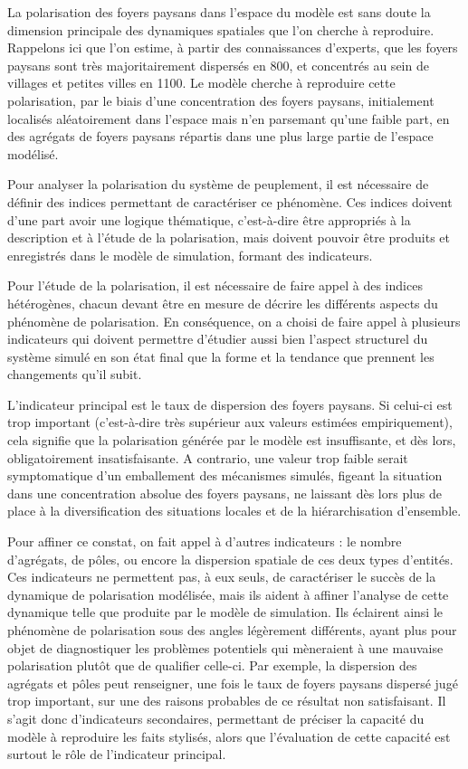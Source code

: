 La polarisation des foyers paysans dans l'espace du modèle est sans doute la dimension principale des dynamiques spatiales que l'on cherche à reproduire.
Rappelons ici que l'on estime, à partir des connaissances d'experts, que les foyers paysans sont très majoritairement dispersés en 800, et concentrés au sein de villages et petites villes en 1100.
Le modèle cherche à reproduire cette polarisation, par le biais d'une concentration des foyers paysans, initialement localisés aléatoirement dans l'espace mais n'en parsemant qu'une faible part, en des agrégats de foyers paysans répartis dans une plus large partie de l'espace modélisé.

Pour analyser la polarisation du système de peuplement, il est nécessaire de définir des indices permettant de caractériser ce phénomène.
Ces indices doivent d'une part avoir une logique thématique, c'est-à-dire être appropriés à la description et à l'étude de la polarisation, mais doivent pouvoir être produits et enregistrés dans le modèle de simulation, formant des indicateurs.

Pour l'étude de la polarisation, il est nécessaire de faire appel à des indices hétérogènes, chacun devant être en mesure de décrire les différents aspects du phénomène de polarisation.
En conséquence, on a choisi de faire appel à plusieurs indicateurs qui doivent permettre d'étudier aussi bien l'aspect structurel du système simulé en son état final que la forme et la tendance que prennent les changements qu'il subit.

L'indicateur principal est le taux de dispersion des foyers paysans.
Si celui-ci est trop important (c'est-à-dire très supérieur aux valeurs estimées empiriquement), cela signifie que la polarisation générée par le modèle est insuffisante, et dès lors, obligatoirement insatisfaisante.
A contrario, une valeur trop faible serait symptomatique d'un emballement des mécanismes simulés, figeant la situation dans une concentration absolue des foyers paysans, ne laissant dès lors plus de place à la diversification des situations locales et de la hiérarchisation d'ensemble.

Pour affiner ce constat, on fait appel à d'autres indicateurs :
le nombre d'agrégats, de pôles, ou encore la dispersion spatiale de ces deux types d'entités.
Ces indicateurs ne permettent pas, à eux seuls, de caractériser le succès de la dynamique de polarisation modélisée, mais ils aident à affiner l'analyse de cette dynamique telle que produite par le modèle de simulation.
Ils éclairent ainsi le phénomène de polarisation sous des angles légèrement différents, ayant plus pour objet de diagnostiquer les problèmes potentiels qui mèneraient à une mauvaise polarisation plutôt que de qualifier celle-ci.
Par exemple, la dispersion des agrégats et pôles peut renseigner, une fois le taux de foyers paysans dispersé jugé trop important, sur une des raisons probables de ce résultat non satisfaisant.
Il s'agit donc d'indicateurs secondaires, permettant de préciser la capacité du modèle à reproduire les faits stylisés, alors que l'évaluation de cette capacité est surtout le rôle de l'indicateur principal.


